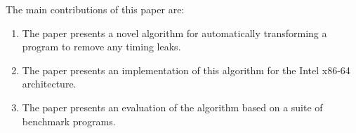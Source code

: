 The main contributions of this paper are:
\begin{enumerate}
\item The paper presents a novel algorithm for automatically transforming a program to remove any timing leaks.
\item The paper presents an implementation of this algorithm for the Intel x86-64 architecture. 
\item The paper presents an evaluation of the algorithm based on a suite of benchmark programs. 
\end{enumerate}

